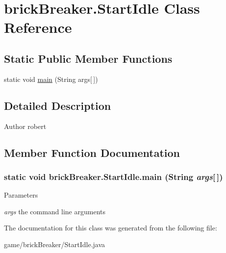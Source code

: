 \hypertarget{classbrick_breaker_1_1_start_idle}{
\section{brickBreaker.StartIdle Class Reference}
\label{classbrick_breaker_1_1_start_idle}
}
\subsection*{Static Public Member Functions}
\begin{DoxyCompactItemize}
\item 
static void \hyperlink{classbrick_breaker_1_1_start_idle_a19cd517d36d1ee07d9bf3c6a8f10e018}{main} (String args\mbox{[}$\,$\mbox{]})
\end{DoxyCompactItemize}


\subsection{Detailed Description}
\begin{DoxyAuthor}{Author}
robert 
\end{DoxyAuthor}


\subsection{Member Function Documentation}
\hypertarget{classbrick_breaker_1_1_start_idle_a19cd517d36d1ee07d9bf3c6a8f10e018}{
\subsubsection[{main}]{\setlength{\rightskip}{0pt plus 5cm}static void brickBreaker.StartIdle.main (String {\em args}\mbox{[}$\,$\mbox{]})}}
\label{classbrick_breaker_1_1_start_idle_a19cd517d36d1ee07d9bf3c6a8f10e018}

\begin{DoxyParams}{Parameters}
\item[{\em args}]the command line arguments \end{DoxyParams}


The documentation for this class was generated from the following file:\begin{DoxyCompactItemize}
\item 
game/brickBreaker/StartIdle.java\end{DoxyCompactItemize}
